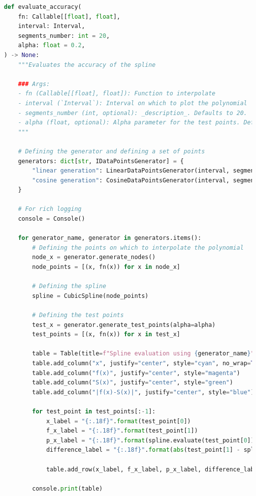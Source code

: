 \documentclass[12pt]{extarticle}
\begin{document}
\begin{lstlisting}[language=Python, caption=Реалізація побудови таблиць з результатами]
def evaluate_accuracy(
    fn: Callable[[float], float],
    interval: Interval,
    segments_number: int = 20,
    alpha: float = 0.2,
) -> None:
    """Evaluates the accuracy of the spline

    ### Args:
    - fn (Callable[[float], float]): Function to interpolate
    - interval (`Interval`): Interval on which to plot the polynomial
    - segments_number (int, optional): _description_. Defaults to 20.
    - alpha (float, optional): Alpha parameter for the test points. Defaults to 0.2.
    """
    
    # Defining the generator and defining a set of points
    generators: dict[str, IDataPointsGenerator] = {
        "linear generation": LinearDataPointsGenerator(interval, segments_number),
        "cosine generation": CosineDataPointsGenerator(interval, segments_number)
    }
    
    # For rich logging
    console = Console()
    
    for generator_name, generator in generators.items():
        # Defining the points on which to interpolate the polynomial
        node_x = generator.generate_nodes()
        node_points = [(x, fn(x)) for x in node_x]
        
        # Defining the spline
        spline = CubicSpline(node_points)
        
        # Defining the test points
        test_x = generator.generate_test_points(alpha=alpha)
        test_points = [(x, fn(x)) for x in test_x]
        
        table = Table(title=f"Spline evaluation using {generator_name}")
        table.add_column("x", justify="center", style="cyan", no_wrap=True)
        table.add_column("f(x)", justify="center", style="magenta")
        table.add_column("S(x)", justify="center", style="green")
        table.add_column("|f(x)-S(x)|", justify="center", style="blue")
    
        for test_point in test_points[:-1]:
            x_label = "{:.18f}".format(test_point[0])
            f_x_label = "{:.18f}".format(test_point[1])
            p_x_label = "{:.18f}".format(spline.evaluate(test_point[0]))
            difference_label = "{:.18f}".format(abs(test_point[1] - spline.evaluate(test_point[0])))
            
            table.add_row(x_label, f_x_label, p_x_label, difference_label)

        console.print(table)
\end{lstlisting}
\end{document}
